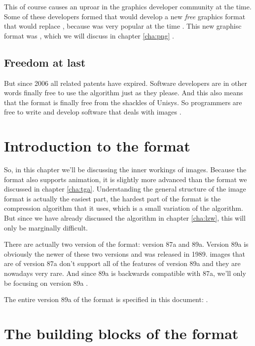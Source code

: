 \begin{refsection}
  This of course causes an uproar in the graphics developer community
  at the time. Some of these developers formed that would develop a new
  \textit{free} graphics format that would replace \gif, because
  \gif was very popular at the time
  . This
  new graphisc format was \png, which we will discuss in chapter
  \ref{cha:png} \cite{roelofs09:_histor_portab_networ_graph_png_format,caie:_sad}.

  \subsection{Freedom at last}

  But since 2006 all \lzw related patents have expired. Software
  developers are in other words finally free to use the \lzw algorithm
  just as they please. And this also means that the \gif format is
  finally free from the shackles of Unisys. So programmers are free to
  write and develop software that deals with \gif images \cite{caie:_sad}.

  \section{Introduction to the \gif format}

  So, in this chapter we'll be discussing the inner workings of \gif
  images. Because the \gif format also supports animation, it is
  slightly more advanced than the \tga format we discussed in chapter
  \ref{cha:tga}. Understanding the general structure of the image
  format is actually the easiest part, the hardest part of the format
  is the compression algorithm that it uses, which is a small
  variation of the \lzw algorithm. But since we have already discussed the \lzw
  algorithm in chapter \ref{cha:lzw}, this will only be marginally
  difficult.

  There are actually two version of the \gif format: version 87a and
  89a. Version 89a is obviously the newer of these two versions and
  was released in 1989. \gif images that are of version 87a don't
  support all of the features of version 89a and they are nowadays
  very rare. And since 89a is backwards compatible with 87a, we'll
  only be focusing on version 89a \cite{gif89a,gif87a}.

  The entire version 89a of the \gif format is specified in this
  document: \cite{gif89a}.

  \section{The building blocks of the \gif format}


\end{refsection}
